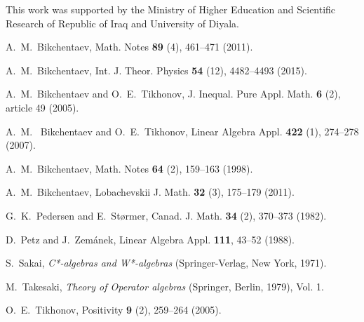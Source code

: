 \documentclass[
11pt,%
tightenlines,%
twoside,%
onecolumn,%
nofloats,%
nobibnotes,%
nofootinbib,%
superscriptaddress,%
noshowpacs,%
centertags]%
{revtex4}
\theoremstyle{definition}
\begin{document}
\begin{acknowledgments}
This work was supported by the Ministry of Higher Education and Scientific Research
of Republic of Iraq and University of Diyala.
\end{acknowledgments}

\begin{thebibliography}{99}

  A.~M.~Bikchentaev,  Math. Notes {\bf 89} (4), 461--471 (2011).

  A.~M.~Bikchentaev, Int. J. Theor. Physics {\bf 54} (12), 4482--4493 (2015).

 A.~M.~Bikchentaev and O.~E.~Tikhonov,
 J. Inequal. Pure Appl. Math. {\bf 6} (2), article 49 (2005).

 A.~M.~ Bikchentaev and O.~E.~Tikhonov,
 Linear Algebra Appl. {\bf 422} (1), 274--278 (2007).

  A.~M.~Bikchentaev,  Math. Notes {\bf 64} (2), 159--163 (1998).

  A.~M.~Bikchentaev,  Lobachevskii J. Math. {\bf 32} (3), 175--179 (2011).

   G.~K.~Pedersen and  E.~St\o rmer, Canad. J. Math. {\bf 34} (2), 370--373 (1982).

  D.~Petz  and   J.~Zem{\'a}nek,  Linear Algebra Appl.
{\bf 111}, 43--52 (1988).

 S.~Sakai, {\it C*-algebras and W*-algebras} (Springer-Verlag, New York, 1971).

  M.~Takesaki, {\it Theory of Operator algebras}  (Springer, Berlin, 1979), Vol. 1.

   O.~E.~Tikhonov,  Positivity {\bf 9} (2), 259--264 (2005).

\end{thebibliography}
\end{document}
